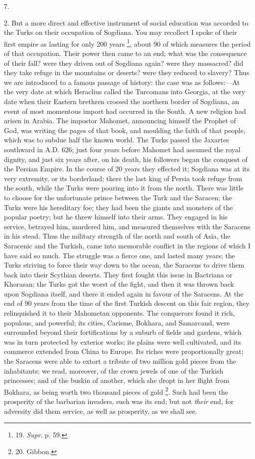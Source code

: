 7.

2. But a more direct and
effective instrument of social education was accorded to the Turks on
their occupation of Sogdiana. You may recollect I spoke of their first
empire as lasting for only 200 years \footnote{19.
\emph{Supr}. p. 59.}, about 90 of which measures the period of that occupation.
Their power then came to an end; what was the consequence of
their fall? were they driven out of Sogdiana again? were they
massacred? did they take refuge in the mountains or deserts? were they
reduced to slavery? Thus we are introduced to a famous passage of
history: the case was as follows:—At the very date at which
Heraclius called the Turcomans into Georgia, at the very date when
their Eastern brethren crossed the northern border of Sogdiana, an
event of most momentous import had occurred in the South. A new
religion had arisen in Arabia. The impostor Mahomet, announcing
himself the Prophet of God, was writing the pages of that book, and
moulding the faith of that people, which was to subdue half the known
world. The Turks passed the Jaxartes southward in A.D.
626; just four years before Mahomet had assumed the royal dignity, and
just six years after, on his death, his followers began the conquest
of the Persian Empire. In the course of 20 years they effected it;
Sogdiana was at its very extremity, or its borderland; there the last
king of Persia took refuge from the south, while the Turks were
pouring into it from the north. There was little to choose for the
unfortunate prince between the Turk and the Saracen; the Turks were
his hereditary foe; they had been the giants and monsters of the
popular poetry; but he threw himself into their arms. They engaged in
his service, betrayed him, murdered him, and measured themselves with
the Saracens in his stead. Thus the military strength of the north and
south of Asia, the Saracenic and the Turkish, came into memorable
conflict in the regions of which I have said so much. The struggle was
a fierce one, and lasted many years; the Turks striving to force their
way down to the ocean, the Saracens to drive them back into their
Scythian deserts. They first fought this issue in Bactriana or
Khorasan; the Turks got the worst of the fight, and then it was thrown
back upon Sogdiana itself, and there it ended again in favour of the
Saracens. At the end of 90 years from the time of the first Turkish
descent on this fair region, they relinquished it to their Mahometan
opponents. The conquerors found it rich, populous, and powerful; its
cities, Carisme, Bokhara, and Samarcand, were surrounded beyond their
fortifications by a suburb of fields and gardens, which was in turn
protected by exterior works; its plains were well cultivated, and its
commerce extended from China to Europe. Its riches were proportionally
great; the Saracens were able to extort a tribute of two million gold
pieces from the inhabitants; we read, moreover, of the crown jewels of
one of the Turkish princesses; and of the buskin of another, which she
dropt in her flight from Bokhara, as being worth two thousand pieces
of gold \footnote{20.
Gibbon.}. Such had been
the prosperity of the barbarian invaders, such was its end; but not \emph{their}
end, for adversity did them service, as well as prosperity, as we
shall see.

